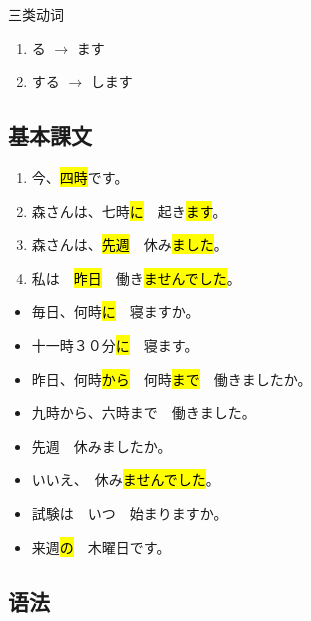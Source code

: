 三类动词

\begin{enumerate}
    \item {}る $\rightarrow$ ます
    \item する $\rightarrow$ します
\end{enumerate}


\subsection{基本課文}

\begin{enumerate}
    \item 今、\hl{四時}です。
    \item 森さんは、七時\hl{に}　起き\hl{ます}。 
    \item 森さんは、\hl{先週}　休み\hl{ました}。
    \item 私は　\hl{昨日}　働き\hl{ませんでした}。
\end{enumerate}


\begin{itemize}
    \item 毎日、何時\hl{に}　寝ますか。
    \item 十一時３０分\hl{に}　寝ます。
\end{itemize}



\begin{itemize}
    \item 昨日、何時\hl{から}　何時\hl{まで}　働きましたか。
    \item 九時から、六時まで　働きました。
\end{itemize}


\begin{itemize}
    \item 先週　休みましたか。
    \item いいえ、　休み\hl{ませんでした}。
\end{itemize}


\begin{itemize}
    \item 試験は　いつ　始まりますか。
    \item 来週\hl{の}　木曜日です。
\end{itemize}


\subsection{语法}

